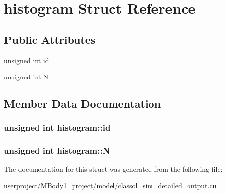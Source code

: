 \hypertarget{structhistogram}{\section{histogram Struct Reference}
\label{structhistogram}
}
\subsection*{Public Attributes}
\begin{DoxyCompactItemize}
\item 
unsigned int \hyperlink{structhistogram_a9696f69b741b869f3d569461d527513c}{id}
\item 
unsigned int \hyperlink{structhistogram_a58842f79a6c96378a2bcee46df1664ad}{N}
\end{DoxyCompactItemize}


\subsection{Member Data Documentation}
\hypertarget{structhistogram_a9696f69b741b869f3d569461d527513c}{
\subsubsection[{id}]{\setlength{\rightskip}{0pt plus 5cm}unsigned int histogram\+::id}}\label{structhistogram_a9696f69b741b869f3d569461d527513c}
\hypertarget{structhistogram_a58842f79a6c96378a2bcee46df1664ad}{
\subsubsection[{N}]{\setlength{\rightskip}{0pt plus 5cm}unsigned int histogram\+::\+N}}\label{structhistogram_a58842f79a6c96378a2bcee46df1664ad}


The documentation for this struct was generated from the following file\+:\begin{DoxyCompactItemize}
\item 
userproject/\+M\+Body1\+\_\+project/model/\hyperlink{classol__sim__detailed__output_8cu}{classol\+\_\+sim\+\_\+detailed\+\_\+output.\+cu}\end{DoxyCompactItemize}
